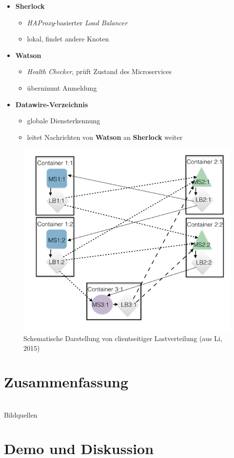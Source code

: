 \documentclass{beamer}
\begin{document}
\begin{frame}{\insertsubsection}
	\begin{itemize}[<+->]
		\item \textbf{Sherlock} 
		\begin{itemize}
			\item \textit{HAProxy}-basierter \textit{Load Balancer}
			\item lokal, findet andere Knoten
		\end{itemize}
		\item \textbf{Watson} 
		\begin{itemize}
			\item \textit{Health Checker}, prüft Zustand des Microservices 
			\item übernimmt Anmeldung
		\end{itemize}
		\item \textbf{Datawire-Verzeichnis} 
		\begin{itemize}
			\item globale Diensterkennung
			\item leitet Nachrichten von \textbf{Watson} an \textbf{Sherlock} weiter
		\end{itemize}
	\end{itemize}
	\vfill
	\hfill{\footnotesize\cite{Li15}}
\end{frame}

\begin{frame}{\insertsubsection}
	\begin{figure}
		\centering
		\includegraphics[width=.65\linewidth]{img/clientloadbal}
		\caption{Schematische Darstellung von clientseitiger Lastverteilung (aus Li, 2015)}
		\label{fig:clientseitige_lastverteilung}
	\end{figure}
\end{frame}

\section{Zusammenfassung}

\section{\bibname}
\begin{frame}[allowframebreaks]{\bibname}
	\AtBeginSection{}
	\nocite{*}
	
	
\end{frame}
\begin{frame}[allowframebreaks]{Bildquellen}
\end{frame}

\section{Demo und Diskussion}
\end{document}

